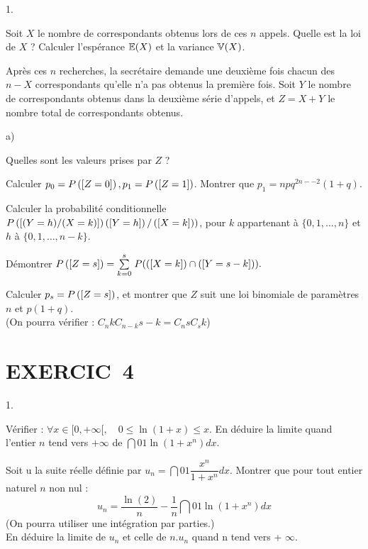 \documentclass[11pt]{article}%
\begin{document}
\begin{noliste}{1.}
 \setlength{\itemsep}{4mm}
\item Soit $X$ le nombre de correspondants obtenus lors de ces $n$
appels.
Quelle est la loi de $X$ ? Calculer l'espérance $\mathbb{E}(X)$ et la variance
$\mathbb{V}(X)$.

\item Après ces $n$ recherches, la secrétaire demande une deuxième fois
chacun des $n-X$ correspondants qu'elle n'a pas obtenus la première
fois.
Soit $Y$ le nombre de correspondants obtenus dans la deuxième série
d'appels, et $Z = X + Y$ le nombre total de correspondants obtenus.

\begin{noliste}{a)}
 \setlength{\itemsep}{2mm}
\item Quelles sont les valeurs prises par $Z$ ?

\item Calculer $p_{0} = P\left(\left[ {Z = 0} \right]\right),p_{1} = P\left(\left[ {Z =
1} \right]\right)$. Montrer que $p_{1} = npq^{2n--2}(1 + q).$

\item Calculer la probabilité conditionnelle $P\left(\left[ {(Y = h)/(X =
k)} \right]\right)\left(\left[ {Y = h} \right]\right)/\left(\left[ {X = k} \right]\right))$, pour $k$
appartenant à $\{0,1,\dots,n\}$ et $h$ à $\{0,1,\dots,n-k\}$.

\item Démontrer $P\left(\left[ {Z = s} \right]\right) = {\textstyle\sum\limits_{k = 0}^{s}}\hspace{.1cm}P(\left(\left[ {X
= k} \right]\right)\cap \left(\left[ {Y = s-k} \right]\right)).$

\item Calculer $p_{s} = P\left(\left[ {Z = s} \right]\right)$, et montrer que $Z$
suit une loi binomiale de
paramètres $n$ et $p(1 + q)$. \\
(On pourra vérifier : $C_{n}{k}C_{n-k}{s-k} = C_{n}{s}C_{s}{k}$)
\end{noliste}
\end{noliste}

\section*{EXERCIC\E\ 4}

\begin{noliste}{1.}
 \setlength{\itemsep}{4mm}
\item Vérifier : $\forall x\in \lbrack 0, + \infty \lbrack,\quad 0\leq
\ln (1 + x)\leq x.$ En déduire la limite quand l'entier $n$ tend vers $
+ \infty $ de $\dint{0}{1}\ln (1 + x^{n})dx$.

\item Soit u la suite réelle définie par $u_{n} =
\dint{0}{1}\dfrac{x^{n}}{1 + x^{n}}dx$. Montrer que pour tout entier
naturel $n$ non nul : 
\[
u_{n} = \dfrac{\ln (2)}{n}-\dfrac{1}{n}\dint{0}{1}\ln (1 + x^{n})dx
\]
(On pourra utiliser une intégration par parties.)\\
En déduire la limite de $u_{n}$ et celle de $n.u_{n}$ quand n tend vers
+ $\infty $.
\end{noliste}

\label{fin}
\end{document}
